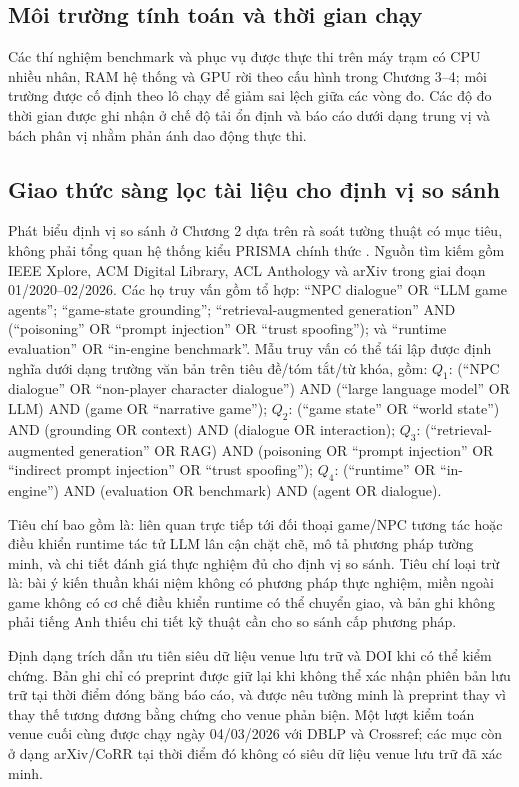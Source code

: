﻿\documentclass[a4paper,12pt]{article}
\begin{document}
\subsection{Môi trường tính toán và thời gian chạy}
Các thí nghiệm benchmark và phục vụ được thực thi trên máy trạm có CPU nhiều nhân, RAM hệ thống và GPU rời theo cấu hình trong Chương 3--4; môi trường được cố định theo lô chạy để giảm sai lệch giữa các vòng đo. Các độ đo thời gian được ghi nhận ở chế độ tải ổn định và báo cáo dưới dạng trung vị và bách phân vị nhằm phản ánh dao động thực thi.

\subsection{Giao thức sàng lọc tài liệu cho định vị so sánh}
Phát biểu định vị so sánh ở Chương 2 dựa trên rà soát tường thuật có mục tiêu, không phải tổng quan hệ thống kiểu PRISMA chính thức \cite{Page2021PRISMA2020}. Nguồn tìm kiếm gồm IEEE Xplore, ACM Digital Library, ACL Anthology và arXiv trong giai đoạn 01/2020--02/2026. Các họ truy vấn gồm tổ hợp: ``NPC dialogue'' OR ``LLM game agents''; ``game-state grounding''; ``retrieval-augmented generation'' AND (``poisoning'' OR ``prompt injection'' OR ``trust spoofing''); và ``runtime evaluation'' OR ``in-engine benchmark''. Mẫu truy vấn có thể tái lập được định nghĩa dưới dạng trường văn bản trên tiêu đề/tóm tắt/từ khóa, gồm: \(Q_1\): (``NPC dialogue'' OR ``non-player character dialogue'') AND (``large language model'' OR LLM) AND (game OR ``narrative game''); \(Q_2\): (``game state'' OR ``world state'') AND (grounding OR context) AND (dialogue OR interaction); \(Q_3\): (``retrieval-augmented generation'' OR RAG) AND (poisoning OR ``prompt injection'' OR ``indirect prompt injection'' OR ``trust spoofing''); \(Q_4\): (``runtime'' OR ``in-engine'') AND (evaluation OR benchmark) AND (agent OR dialogue).

Tiêu chí bao gồm là: liên quan trực tiếp tới đối thoại game/NPC tương tác hoặc điều khiển runtime tác tử LLM lân cận chặt chẽ, mô tả phương pháp tường minh, và chi tiết đánh giá thực nghiệm đủ cho định vị so sánh. Tiêu chí loại trừ là: bài ý kiến thuần khái niệm không có phương pháp thực nghiệm, miền ngoài game không có cơ chế điều khiển runtime có thể chuyển giao, và bản ghi không phải tiếng Anh thiếu chi tiết kỹ thuật cần cho so sánh cấp phương pháp.

Định dạng trích dẫn ưu tiên siêu dữ liệu venue lưu trữ và DOI khi có thể kiểm chứng. Bản ghi chỉ có preprint được giữ lại khi không thể xác nhận phiên bản lưu trữ tại thời điểm đóng băng báo cáo, và được nêu tường minh là preprint thay vì thay thế tương đương bằng chứng cho venue phản biện. Một lượt kiểm toán venue cuối cùng được chạy ngày 04/03/2026 với DBLP và Crossref; các mục còn ở dạng arXiv/CoRR tại thời điểm đó không có siêu dữ liệu venue lưu trữ đã xác minh.
\end{document}
